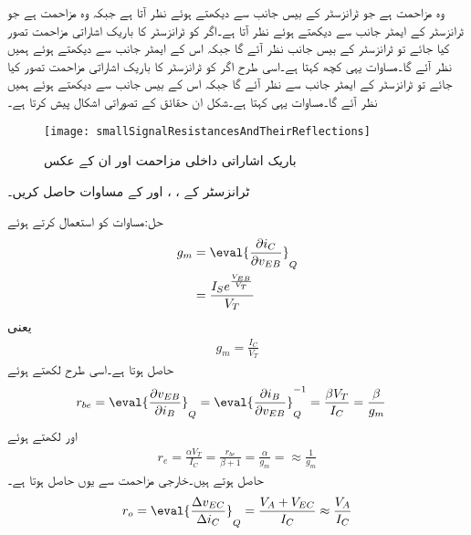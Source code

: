  وہ مزاحمت ہے جو ٹرانزسٹر کے بیس جانب سے دیکھتے ہوئے نظر آتا ہے جبکہ   وہ مزاحمت ہے جو ٹرانزسٹر کے ایمٹر جانب سے دیکھتے ہوئے نظر آتا ہے۔اگر   کو ٹرانزسٹر کا باریک اشاراتی مزاحمت تصور کیا جائے تو ٹرانزسٹر کے بیس جانب   نظر آئے گا جبکہ اس کے ایمٹر جانب سے دیکھتے ہوئے ہمیں  نظر آئے گا۔مساوات   یہی کچھ کہتا ہے۔اسی طرح اگر   کو ٹرانزسٹر کا باریک اشاراتی مزاحمت تصور کیا جائے تو ٹرانزسٹر کے ایمٹر جانب سے   نظر آئے گا جبکہ اس کے بیس جانب سے دیکھتے ہوئے ہمیں  نظر آئے گا۔مساوات   یہی کہتا ہے۔شکل   ان حقائق کے تصوراتی اشکال پیش کرتا ہے۔
\begin{figure}
\centering
\texttt{[image: smallSignalResistancesAndTheirReflections]}
\caption{باریک اشاراتی داخلی مزاحمت اور ان کے عکس}
\label{شکل_باریک_اشاراتی_مزاحمت_اور_ان_کے_عکس}
\end{figure}
 ٹرانزسٹر کے ، ، اور  کے مساوات حاصل کریں۔

حل:مساوات  کو استعمال کرتے ہوئے
\begin{align*}
g_m&=\eval{\frac{ \partial i_C}{\partial v_{EB}}}_Q\\
&=\frac{I_S e^{\frac{V_{EB}}{V_T}}}{V_T}
\end{align*}
یعنی
\begin{align}
g_m=\frac{I_{C}}{V_T}
\end{align}
حاصل ہوتا ہے۔اسی طرح  لکھتے ہوئے
\begin{align}
r_{be}&=\eval{\frac{\partial v_{EB}}{\partial i_B}}_Q=\eval{\frac{\partial i_B}{\partial v_{EB}}}_Q^{-1}=\frac{\beta V_T}{I_C}=\frac{\beta}{g_m}
\end{align}
اور   لکھتے ہوئے
\begin{align}
r_e=\frac{\alpha V_T}{I_C}=\frac{r_{be}}{\beta+1}=\frac{\alpha}{g_m}=\approx \frac{1}{g_m}
\end{align}
حاصل ہوتے ہیں۔خارجی مزاحمت  سے یوں حاصل ہوتا ہے۔
\begin{align}
r_o=\eval{\frac{\Delta v_{EC}}{\Delta i_C}}_Q=\frac{V_A+V_{EC}}{I_{C}} \approx \frac{V_A}{I_C}
\end{align}


